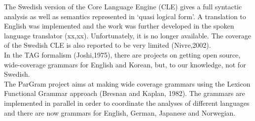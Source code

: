 \documentclass{report}
\begin{document}
The Swedish version of the Core Language Engine (CLE) \cite{gamback} %
gives a full syntactic analysis as well as semantics represented in `quasi logical form'. A
translation to English  was implemented and the work was further developed in the spoken
language translator (xx,xx). Unfortunately, it is no longer available. The coverage of the Swedish
CLE is also reported to be very limited (Nivre,2002).\\

In the TAG formalism (Joshi,1975), there are projects on getting open source, wide-coverage grammars
for English and Korean, but, to our knowledge, not for Swedish.  \\

The ParGram project aims at making wide coverage grammars using the Lexicon Functional Grammar approach
(Bresnan and Kaplan, 1982).
The grammars are implemented in parallel in order to coordinate the analyses of
different languages and there are now grammars for English, German, Japanese and Norwegian. 



\end{document}
